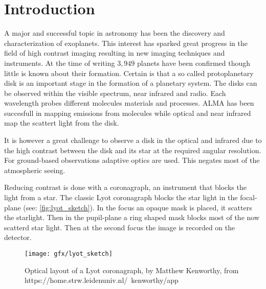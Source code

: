 
\chapter{Introduction} %

\label{ch:intro} %


A major and successful topic in astronomy has been the discovery and characterization of exoplanets. This interest has sparked great progress in the field of high contrast imaging resulting in new imaging techniques and instruments. At the time of writing $3,949$ planets have been confirmed though little is known about their formation. Certain is that a so called protoplanetary disk is an important stage in the formation of a planetary system. The disks can be observed within the visible spectrum, near infrared and radio. Each wavelength probes different molecules materials and processes. ALMA has been succesfull in mapping emissions from molecules while optical and near infrared map the scattert light from the disk.

It is however a great challenge to observe a disk in the optical and infrared due to the high contrast between the disk and its star at the required angular resolution. For ground-based observations adaptive optics are used. This negates most of the atmospheric seeing.

Reducing contrast is done with a coronagraph, an instrument that blocks the light from a star. The classic Lyot coronagraph blocks the star light in the focal-plane (see: \autoref{fig:lyot_sketch}). In the focus an opaque mask is placed, it scatters the starlight. Then in the pupil-plane a ring shaped mask blocks most of the now scatterd star light. Then at the second focus the image is recorded on the detector.

\begin{figure}
    \texttt{[image: gfx/lyot\_sketch]}
    \caption{Optical layout of a Lyot coronagraph, by Matthew Kenworthy, from https://home.strw.leidenuniv.nl/~kenworthy/app}
    \label{fig:lyot_sketch}
\end {figure}

